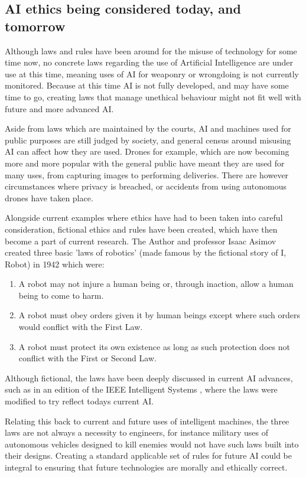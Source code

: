\documentclass[article]{IEEEtran}
\begin{document}
\subsection{AI ethics being considered today, and tomorrow}
Although laws and rules have been around for the misuse of technology for some time now, no concrete laws regarding the use of Artificial Intelligence are under use at this time, meaning uses of AI for weaponry or wrongdoing is not currently monitored. Because at this time AI is not fully developed, and may have some time to go, creating laws that manage unethical behaviour might not fit well with future and more advanced AI. \par
Aside from laws which are maintained by the courts, AI and machines used for public purposes are still judged by society, and general census around misusing AI can affect how they are used. Drones for example, which are now becoming more and more popular with the general public have meant they are used for many uses, from capturing images to performing deliveries. There are however circumstances where privacy is breached, or accidents from using autonomous drones have taken place.\par
Alongside current examples where ethics have had to been taken into careful consideration, fictional ethics and rules have been created, which have then become a part of current research. The Author and professor Isaac Asimov created three basic 'laws of robotics' (made famous by the fictional story of I, Robot) in \cite{laws} 1942 which were:
\begin{enumerate}
\item A robot may not injure a human being or, through inaction, allow a human being to come to harm.
\item A robot must obey orders given it by human beings except where such orders would conflict with the First Law.
\item A robot must protect its own existence as long as such protection does not conflict with the First or Second Law. 
\end{enumerate}
Although fictional, the laws have been deeply discussed in current AI advances, such as in an edition of the IEEE Intelligent Systems \cite{ieeRobots}, where the laws were modified to try reflect todays current AI.\par
 Relating this back to current and future uses of intelligent machines, the three laws are not always a necessity to engineers, for instance military uses of autonomous vehicles designed to kill enemies would not have such laws built into their designs. 
Creating a standard applicable set of rules for future AI could be integral to ensuring that future technologies are morally and ethically correct.
\end{document}
